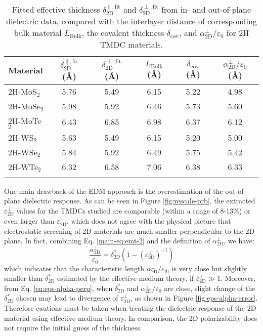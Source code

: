 \documentclass[journal=ancac3,email=true,hyperref=true,keywords=false]{achemso}
\begin{document}
\begin{table}[htbp]
  \centering
  \begin{tabular}[htbp]{lccccc}
  \hline{}
  Material & $\delta_{\mathrm{2D}}^{\parallel, \mathrm{fit}}$ (\AA) & $\delta_{\mathrm{2D}}^{\perp, \mathrm{fit}}$ ({\AA})& $L_{\mathrm{Bulk}}$ ({\AA}) & $\delta_{\mathrm{cov}}$ ({\AA}) & $\alpha_{\mathrm{2D}}^{\perp}/\varepsilon_{0}$ ({\AA})\\
  \hline{}
  2H-MoS$_{2}$ & 5.76 & 5.49 & 6.15 & 5.22 & 4.98\\
  2H-MoSe$_{2}$ & 5.98 & 5.92 & 6.46 &  5.73 & 5.60\\
  2H-MoTe$_{2}$ & 6.43 & 6.85 & 6.98 & 6.37 & 6.12\\
  2H-WS$_{2}$ & 5.63 & 5.49 & 6.15 & 5.20 & 5.00\\
  2H-WSe$_{2}$ & 5.84 & 5.92 & 6.49 & 5.75 & 5.42\\
  2H-WTe$_{2}$ & 6.32 & 6.58 & 7.06 & 6.38 & 6.33\\
  \hline{}
\end{tabular}

\caption{Fitted effective thickness
  $\delta_{\mathrm{2D}}^{\parallel, \mathrm{fit}}$ and
  $\delta_{\mathrm{2D}}^{\perp, \mathrm{fit}}$ from in- and
  out-of-plane dielectric data, compared with the interlayer distance
  of corresponding bulk material $L_{\mathrm{Bulk}}$, the covalent
  thickness $\delta_{\mathrm{cov}}$, and
  $\alpha_{\mathrm{2D}}^{\perp}/\varepsilon_{0}$ for 2H TMDC
  materials.}
\label{tab:delta-L-DFt}
\end{table}

One main drawback of the EDM approach is the
overestimation of the out-of-plane dielectric response. As can be seen
in Figure \ref{fig:rescale-prb}, the extracted
$\varepsilon_{\mathrm{2D}}^{\perp}$ values for the TMDCs studied
are comparable (within a range of 8-13\%) or even larger than
$\varepsilon_{\mathrm{2D}}^{\parallel}$, which does not agree with the
physical picture that electrostatic screening of 2D materials are much
smaller perpendicular to the 2D plane. In fact, combining
Eq. \ref{main-eq:emt-2} and the definition of $\alpha_{\mathrm{2D}}^{\perp}$, we
have:
\begin{equation}
  \label{eq:eps-alpha-perp}
  \frac{\alpha_{\mathrm{2D}}^{\perp}}{\varepsilon_{0}} = \delta^{*}_{\mathrm{2D}}(1 - (\varepsilon_{\mathrm{2D}}^{\perp})^{-1})
\end{equation}
%
%
which indicates that the characteristic length
$\alpha_{\mathrm{2D}}^{\perp}/\varepsilon_{0}$, is very close but slightly smaller
than $\delta_{\mathrm{2D}}^{*}$ estimated by the effective medium theory,
if $\varepsilon^{\perp}_{\mathrm{2D}} \gg 1$. Moreover, from
Eq. \ref{eq:eps-alpha-perp}, when $\delta_{\mathrm{2D}}^{*}$ and
$\alpha_{\mathrm{2D}}^{\perp}/\varepsilon_{0}$ are close, slight change of the
$\delta_{\mathrm{2D}}^{*}$ chosen may lead to divergence of
$\varepsilon_{\mathrm{2D}}^{\perp}$, as shown in Figure
\ref{fig:eps-alpha-error}. Therefore cautions must be taken when
treating the dielectric response of the 2D material using effective
medium theory. In comparison, the 2D polarizability does not require
the initial guess of the thickness.  
\end{document}
